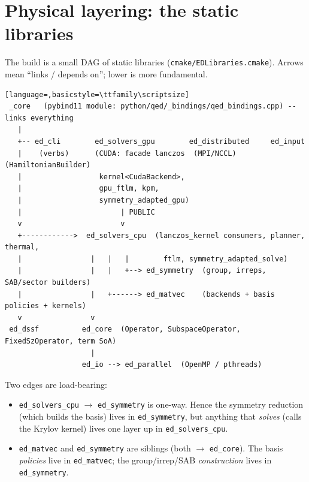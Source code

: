 \documentclass[11pt]{article}
\newcommand{\code}[1]{\texttt{\small #1}}
\newcommand{\file}[1]{\texttt{\footnotesize #1}}
\begin{document}
\section{Physical layering: the static libraries}

The build is a small DAG of static libraries
(\file{cmake/EDLibraries.cmake}). Arrows mean ``links / depends on'';
lower is more fundamental.

\begin{center}
\begin{lstlisting}[language=,basicstyle=\ttfamily\scriptsize]
 _core   (pybind11 module: python/qed/_bindings/qed_bindings.cpp) -- links everything
   |
   +-- ed_cli        ed_solvers_gpu        ed_distributed     ed_input
   |    (verbs)      (CUDA: facade lanczos  (MPI/NCCL)        (HamiltonianBuilder)
   |                  kernel<CudaBackend>,
   |                  gpu_ftlm, kpm,
   |                  symmetry_adapted_gpu)
   |                       | PUBLIC
   v                       v
   +------------>  ed_solvers_cpu  (lanczos_kernel consumers, planner, thermal,
   |                |   |   |        ftlm, symmetry_adapted_solve)
   |                |   |   +--> ed_symmetry  (group, irreps, SAB/sector builders)
   |                |   +------> ed_matvec    (backends + basis policies + kernels)
   v                v
 ed_dssf          ed_core  (Operator, SubspaceOperator, FixedSzOperator, term SoA)
                    |
                  ed_io --> ed_parallel  (OpenMP / pthreads)
\end{lstlisting}
\end{center}

Two edges are load-bearing:
\begin{itemize}[nosep]
  \item \code{ed\_solvers\_cpu} $\to$ \code{ed\_symmetry} is one-way. Hence
  the symmetry reduction (which builds the basis) lives in
  \code{ed\_symmetry}, but anything that \emph{solves} (calls the Krylov
  kernel) lives one layer up in \code{ed\_solvers\_cpu}.
  \item \code{ed\_matvec} and \code{ed\_symmetry} are siblings (both
  $\to$ \code{ed\_core}). The basis \emph{policies} live in
  \code{ed\_matvec}; the group/irrep/SAB \emph{construction} lives in
  \code{ed\_symmetry}.
\end{itemize}

\end{document}
